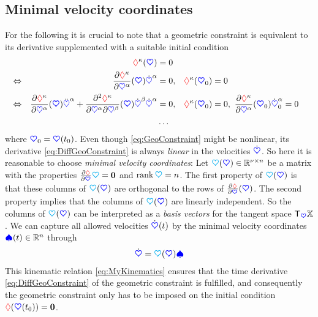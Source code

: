 \subsection{Minimal velocity coordinates}
For the following it is crucial to note that a geometric constraint is equivalent to its derivative supplemented with a suitable initial condition
\begin{subequations}
\begin{align}
 \label{eq:GeoConstraint}
 &&
 \geoConstraintCoeff{\CidxI}(\sysCoord) &= 0
\\
 \label{eq:DiffGeoConstraint}
 &\Leftrightarrow&
 \pdiff[\geoConstraintCoeff{\CidxI}]{\sysCoordCoeff{\GidxI}}(\sysCoord) \sysCoordCoeffd{\GidxI} &= 0,&
 \geoConstraintCoeff{\CidxI}(\sysCoord_0) &= 0
\\
 &\Leftrightarrow&
 \pdiff[\geoConstraintCoeff{\CidxI}]{\sysCoordCoeff{\GidxI}}(\sysCoord) \sysCoordCoeffdd{\GidxI} + \frac{\partial^2 \geoConstraintCoeff{\CidxI}}{\partial \sysCoordCoeff{\GidxI} \partial \sysCoordCoeff{\GidxII}}(\sysCoord) \sysCoordCoeffd{\GidxII} \sysCoordCoeffd{\GidxI} &= 0,&
 \geoConstraintCoeff{\CidxI}(\sysCoord_0) &= 0, \ \pdiff[\geoConstraintCoeff{\CidxI}]{\sysCoordCoeff{\GidxI}}(\sysCoord_0) \sysCoordCoeffd{\GidxI}_0 = 0
\\
 &&
 &\ldots \nonumber
\end{align}
\end{subequations}
where $\sysCoord_0 = \sysCoord(t_0)$.
Even though \eqref{eq:GeoConstraint} might be nonlinear, its derivative \eqref{eq:DiffGeoConstraint} is always \textit{linear} in the velocities $\sysCoordd$.
So here it is reasonable to choose \textit{minimal velocity coordinates}:
Let $\kinMat(\sysCoord) \in \RealNum^{\numCoord\times\dimConfigSpace}$ be a matrix with the properties $\pdiff[\geoConstraint]{\sysCoord} \kinMat = \mat{0}$ and $\rank \kinMat = \dimConfigSpace$.
The first property of $\kinMat(\sysCoord)$ is that these columns of $\kinMat(\sysCoord)$ are orthogonal to the rows of $\pdiff[\geoConstraint]{\sysCoord}(\sysCoord)$.
The second property implies that the columns of $\kinMat(\sysCoord)$ are linearly independent.
So the columns of $\kinMat(\sysCoord)$ can be interpreted as a \textit{basis vectors} for the tangent space $\Tangent[\sysCoord] \configSpace$.
We can capture all allowed velocities $\sysCoordd(t)$ by the minimal velocity coordinates $\sysVel(t) \in \RealNum^{\dimConfigSpace}$ through
\begin{align}\label{eq:MyKinematics}
 \sysCoordd = \kinMat(\sysCoord) \sysVel
\end{align}
This kinematic relation \eqref{eq:MyKinematics} ensures that the time derivative \eqref{eq:DiffGeoConstraint} of the geometric constraint is fulfilled, and consequently the geometric constraint only has to be imposed on the initial condition $\geoConstraint(\sysCoord(t_0)) = \tuple{0}$.

